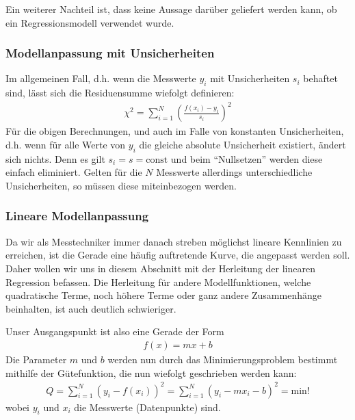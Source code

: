 \documentclass[letterpaper,10pt,english]{jupyterBook}
\begin{document}
\sphinxAtStartPar
Ein weiterer Nachteil ist, dass keine Aussage darüber geliefert werden kann, ob ein  Regressionsmodell verwendet wurde.


\subsubsection{Modellanpassung mit Unsicherheiten }
\label{\detokenize{content/1_Kurvenanpassung:modellanpassung-mit-unsicherheiten-a-id-subsec-modellanpassung-unsicherheiten-a}}
\sphinxAtStartPar
Im allgemeinen Fall, d.h. wenn die Messwerte \(y_i\) mit Unsicherheiten \(s_i\) behaftet sind, lässt sich die Residuensumme wiefolgt definieren:
\begin{equation*}
\begin{split}\chi^2 = \sum_{i=1}^N \left(\frac{f(x_i)-y_i}{s_i}\right)^2\end{split}
\end{equation*}
\sphinxAtStartPar
Für die obigen Berechnungen, und auch im Falle von konstanten Unsicherheiten, d.h. wenn für alle Werte von \(y_i\) die gleiche absolute Unsicherheit existiert, ändert sich nichts. Denn es gilt \(s_i = s = \mathrm{const}\) und beim “Nullsetzen” werden diese einfach eliminiert.
Gelten für die \(N\) Messwerte allerdings unterschiedliche Unsicherheiten, so müssen diese miteinbezogen werden.


\subsubsection{Lineare Modellanpassung }
\label{\detokenize{content/1_Kurvenanpassung:lineare-modellanpassung-a-id-subsec-lineare-modellanpassung-a}}
\sphinxAtStartPar
Da wir als Messtechniker immer danach streben möglichst lineare Kennlinien zu erreichen, ist die Gerade eine häufig auftretende Kurve, die angepasst werden soll. Daher wollen wir uns in diesem Abschnitt mit der Herleitung der linearen Regression befassen. Die Herleitung für andere Modellfunktionen, welche quadratische Terme, noch höhere Terme oder ganz andere Zusammenhänge beinhalten, ist auch deutlich schwieriger.

\sphinxAtStartPar
Unser Ausgangspunkt ist also eine Gerade der Form
\begin{equation*}
\begin{split}f(x) = mx + b\end{split}
\end{equation*}
\sphinxAtStartPar
Die Parameter \(m\) und \(b\) werden nun durch das Minimierungsproblem bestimmt mithilfe der Gütefunktion, die nun wiefolgt geschrieben werden kann:
\begin{equation*}
\begin{split}Q = \sum_{i = 1}^{N} (y_i - f(x_i))^2 = \sum_{i = 1}^{N} (y_i - mx_i - b)^2 = \mathrm{min!}\end{split}
\end{equation*}
\sphinxAtStartPar
wobei \(y_i\) und \(x_i\) die Messwerte (Datenpunkte) sind.
\end{document}
